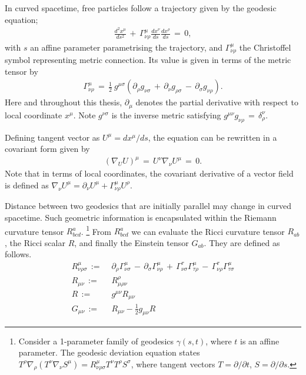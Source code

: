 In curved spacetime, free particles follow a trajectory given by the geodesic equation;
\begin{align}
	\frac{d^2x^\mu}{ds^2} \,+\, \Gamma^\mu_{\nu \rho} \frac{dx^\nu}{ds} \frac{dx^\rho}{ds} \,=\, 0,  \label{eqn:geodesic}
\end{align}
with $s$ an affine parameter parametrising the trajectory, and $\Gamma^\mu_{\nu\rho}$ the Christoffel symbol representing metric connection. Its value is given in terms of the metric tensor by
\begin{align}
	\Gamma^{\mu}_{\nu\rho} \,=\, \frac{1}{2}~ g^{\mu\sigma} \left( \partial_\rho g_{\nu\sigma} \,+\, \partial_\nu g_{\rho\sigma} \,-\, \partial_\sigma g_{\nu\rho}  \right). \label{def:Levi_Civita}
\end{align}
Here and throughout this thesis, $\partial_\mu$ denotes the partial derivative with respect to local coordinate $x^\mu$. Note $g^{\nu\sigma}$ is the inverse metric satisfying $g^{\mu\nu} g_{\nu\rho} \,=\, \delta^\nu_\rho$.

Defining tangent vector as $U^\mu = dx^\mu / ds$, the equation can be rewritten in a covariant form given by
\begin{align}
	\left( \nabla_U U \right)^\mu \,=\, U^\nu \nabla_\nu U^\mu \,=\, 0. \label{eqn:geodesic_covariant}
\end{align}
Note that in terms of local coordinates, the covariant derivative of a vector field is defined as $\nabla_\nu U^\mu = \partial_\nu U^\mu + \Gamma^\mu_{\nu\rho} U^\rho$.

Distance between two geodesics that are initially parallel may change in curved spacetime. Such geometric information is encapsulated within the Riemann curvature tensor $R^a_{bcd}$. \footnote{Consider a 1-parameter family of geodesics $\gamma(s,t)$, where $t$ is an affine parameter. The geodesic deviation equation states $T^\rho \nabla_\rho ( T^\nu \nabla_\nu S^\mu ) = R^\mu_{\nu\rho\sigma} T^\nu T^\rho S^\sigma$, where tangent vectors $T=\partial/\partial t$, $S=\partial/\partial s$.} From $R^a_{bcd}$ we can evaluate the Ricci curvature tensor $R_{ab}$, the Ricci scalar $R$, and finally the Einstein tensor $G_{ab}$. They are defined as follows.
\begin{align}
	R^\mu_{\nu\rho\sigma} \,:=& \,\, \partial_\rho \Gamma^\mu_{\nu\sigma} \,-\, \partial_\sigma \Gamma^\mu_{\nu\rho} \,+\, \Gamma^\tau_{\nu\sigma} \Gamma^\mu_{\tau\rho} \,-\, \Gamma^\tau_{\nu\rho} \Gamma^\mu_{\tau\sigma}  \label{def:Riemann_tensor}\\
	R_{\mu\nu} \,:=& \,\, R^\rho_{\mu\rho\nu}  \\ %
	R \,:=& \,\, g^{\mu\nu} R_{\mu\nu} \\
	G_{\mu\nu} \,:=& \,\, R_{\mu\nu} - \frac{1}{2} g_{\mu\nu} R \label{def:Einstein_tensor}
\end{align}

